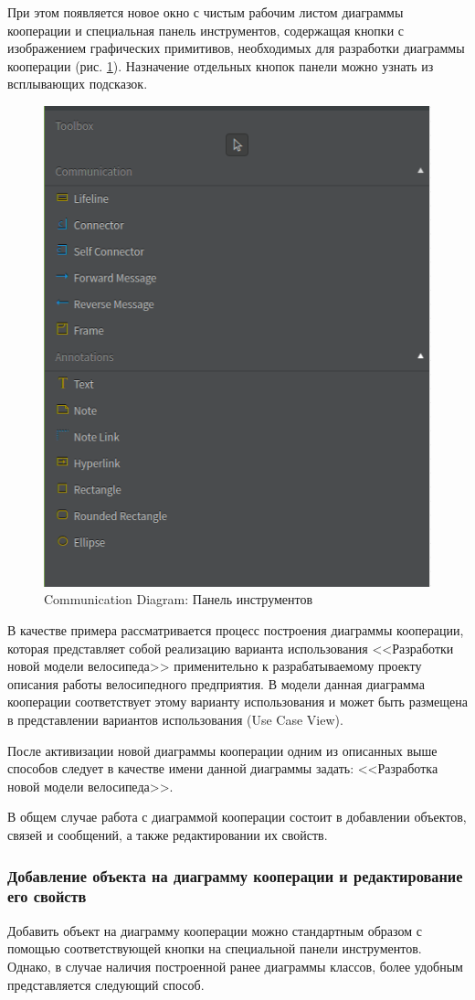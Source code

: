 \documentclass[a4paper,12pt]{report}
\begin{document}
При этом появляется новое окно с чистым рабочим листом диаграммы кооперации и специальная панель инструментов, содержащая кнопки с изображением графических примитивов, необходимых для разработки диаграммы кооперации (рис. \ref{fig:toolboxcommunication}).  Назначение отдельных кнопок панели можно узнать из всплывающих подсказок.

\begin{figure}[h!]
	\centering
	\includegraphics[width=0.5\linewidth]{images/toolboxcommunication}
	\caption{Communication Diagram: Панель инструментов}
	\label{fig:toolboxcommunication}
\end{figure}

В качестве примера рассматривается процесс построения диаграммы кооперации, которая представляет собой реализацию варианта использования <<Разработки новой модели велосипеда>> применительно к разрабатываемому проекту описания работы велосипедного предприятия. В модели данная диаграмма кооперации соответствует этому варианту использования и может быть размещена в представлении вариантов использования (Use Case View).

После активизации новой диаграммы кооперации одним из описанных выше способов следует в качестве имени данной диаграммы задать: <<Разработка новой модели велосипеда>>.

В общем случае работа с диаграммой кооперации состоит в добавлении объектов, связей и сообщений, а также редактировании их свойств.
\subsubsection*{Добавление объекта на диаграмму кооперации и редактирование его свойств}
Добавить объект на диаграмму кооперации можно стандартным образом с помощью соответствующей кнопки на специальной панели инструментов. Однако, в случае наличия построенной ранее диаграммы классов, более удобным представляется следующий способ. 
\end{document}
